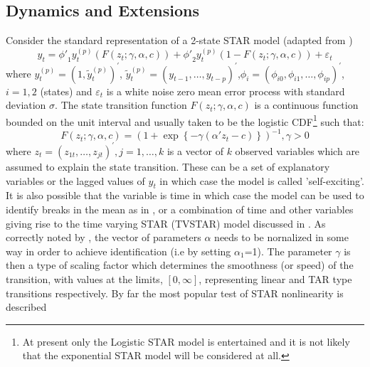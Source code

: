 \subsection{Dynamics and Extensions}
Consider the standard representation of a 2-state STAR model (adapted from
\cite{Dijk1999})
\begin{equation}\label{eq:star_original}
{y_t} = {{\phi '}_1}y_t^{\left( p \right)}\left( {F\left( {{z_t};\gamma
,\alpha ,c} \right)} \right) + {{\phi '}_2}y_t^{\left( p \right)}\left( {1 - F\left( {{z_t};\gamma ,\alpha ,c} \right)} \right) + {\varepsilon _t}
\end{equation}
where $y_t^{\left( p \right)} = {\left( {1,\tilde y_t^{\left( p
\right)}}\right)^\prime }$, $\tilde y_t^{\left( p \right)} = {\left(
{{y_{t-1}},\dots,{y_{t - p}}} \right)^\prime }$,${\phi _i} = {\left( {{\phi
_{i0}},{\phi _{i1}},\dots,{\phi _{ip}}} \right)^\prime }$, $i = 1,2$ (states)
and $\varepsilon_t$ is a white noise zero mean error process with standard deviation
$\sigma$. The state transition function $F\left( {{z_t};\gamma ,\alpha ,c} \right)$ 
is a continuous function bounded on the unit interval and usually taken to be
the logistic CDF\footnote{At present only the Logistic STAR model is
entertained and it is not likely that the exponential STAR model will be
considered at all.} such that:
\begin{equation}\label{eq:logistic_cdf}
F\left( {{z_t};\gamma ,\alpha ,c} \right) = {\left( {1 + \exp \left\{ { -
\gamma \left( {\alpha '{z_t} - c} \right)} \right\}} \right)^{ - 1}},\gamma  > 0
\end{equation}
where ${z_t} = {\left( {{z_{1t}},\dots,{z_{jt}}} \right)^\prime },j = 1,\dots,k$
is a vector of $k$ observed variables which are assumed to explain the state
transition. These can be a set of explanatory variables or the lagged values of $y_t$ in which case
the model is called 'self-exciting'. It is also possible that the variable is
time in which case the model can be used to identify breaks in the mean as in 
\cite{Lin1994}, or a combination of time and other variables giving rise to the
time varying STAR (TVSTAR) model discussed in \cite{Lundbergh2003}. As correctly 
noted by \cite{Dijk1999}, the vector of parameters $\alpha$ needs to be
nornalized in some way in order to achieve identification (i.e by setting
$\alpha_1$=1). The parameter $\gamma$ is then a type of scaling factor which
determines the smoothness (or speed) of the transition, with values at the limits, 
$\left[ {0,\infty } \right]$, representing linear and TAR type
transitions respectively. By far the most popular test of STAR nonlinearity is described 
